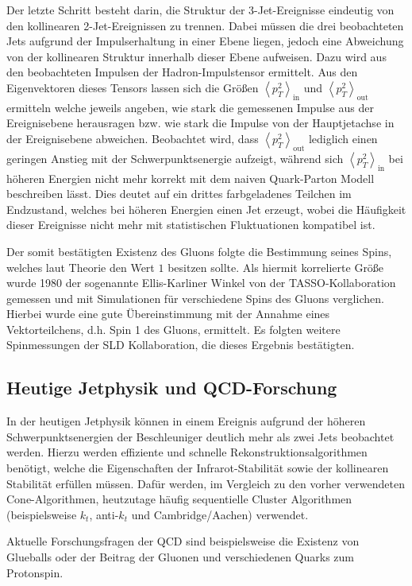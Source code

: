 Der letzte Schritt besteht darin, die Struktur der 3-Jet-Ereignisse eindeutig von den kollinearen 2-Jet-Ereignissen zu trennen.
Dabei müssen die drei beobachteten Jets aufgrund der Impulserhaltung in einer Ebene liegen, jedoch eine Abweichung von der kollinearen Struktur innerhalb dieser Ebene aufweisen.
Dazu wird aus den beobachteten Impulsen der Hadron-Impulstensor ermittelt.
Aus den Eigenvektoren dieses Tensors lassen sich die Größen $\left<p_T^2\right>_\text{in}$ und $\left<p_T^2\right>_\text{out}$ ermitteln welche jeweils angeben, wie stark die gemessenen Impulse aus der Ereignisebene herausragen bzw. wie stark die Impulse von der Hauptjetachse in der Ereignisebene abweichen.
Beobachtet wird, dass $\left<p_T^2\right>_\text{out}$ lediglich einen geringen Anstieg mit der Schwerpunktsenergie aufzeigt, während sich $\left<p_T^2\right>_\text{in}$ bei höheren Energien nicht mehr korrekt mit dem naiven Quark-Parton Modell beschreiben lässt.
Dies deutet auf ein drittes farbgeladenes Teilchen im Endzustand, welches bei höheren Energien einen Jet erzeugt, wobei die Häufigkeit dieser Ereignisse nicht mehr mit statistischen Fluktuationen kompatibel ist.

Der somit bestätigten Existenz des Gluons folgte die Bestimmung seines Spins, welches laut Theorie den Wert $1$ besitzen sollte.
Als hiermit korrelierte Größe wurde 1980 der sogenannte Ellis-Karliner Winkel von der TASSO-Kollaboration gemessen und mit Simulationen für verschiedene Spins des Gluons verglichen.
Hierbei wurde eine gute Übereinstimmung mit der Annahme eines Vektorteilchens, d.h. Spin 1 des Gluons, ermittelt.
Es folgten weitere Spinmessungen der SLD Kollaboration, die dieses Ergebnis bestätigten.

\subsection{Heutige Jetphysik und QCD-Forschung}

In der heutigen Jetphysik können in einem Ereignis aufgrund der höheren Schwerpunktsenergien der Beschleuniger deutlich mehr als zwei Jets beobachtet werden.
Hierzu werden effiziente und schnelle Rekonstruktionsalgorithmen benötigt, welche die Eigenschaften der Infrarot-Stabilität sowie der kollinearen Stabilität erfüllen müssen.
Dafür werden, im Vergleich zu den vorher verwendeten Cone-Algorithmen, heutzutage häufig sequentielle Cluster Algorithmen (beispielsweise $k_t$, anti-$k_t$ und Cambridge/Aachen) verwendet.

Aktuelle Forschungsfragen der QCD sind beispielsweise die Existenz von Glueballs oder der Beitrag der Gluonen und verschiedenen Quarks zum Protonspin.

